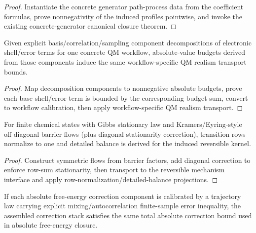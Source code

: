 \begin{proof}
Instantiate the concrete generator path-process data from the coefficient formulas, prove nonnegativity of the induced profiles pointwise, and invoke the existing concrete-generator canonical closure theorem.
\end{proof}

\begin{theorem}\label{thm:concrete-qm-workflow-error-analysis-transport}
Given explicit basis/correlation/sampling component decompositions of electronic shell/error terms for one concrete QM workflow, absolute-value budgets derived from those components induce the same workflow-specific QM realism transport bounds.
\end{theorem}

\begin{proof}
Map decomposition components to nonnegative absolute budgets, prove each base shell/error term is bounded by the corresponding budget sum, convert to workflow calibration, then apply workflow-specific QM realism transport.
\end{proof}

\begin{theorem}\label{thm:barrier-crossing-reversible-chemical-dynamics}
For finite chemical states with Gibbs stationary law and Kramers/Eyring-style off-diagonal barrier flows (plus diagonal stationarity correction), transition rows normalize to one and detailed balance is derived for the induced reversible kernel.
\end{theorem}

\begin{proof}
Construct symmetric flows from barrier factors, add diagonal correction to enforce row-sum stationarity, then transport to the reversible mechanism interface and apply row-normalization/detailed-balance projections.
\end{proof}

\begin{theorem}\label{thm:mixing-autocorrelation-trajectory-correction-total-error}
If each absolute free-energy correction component is calibrated by a trajectory law carrying explicit mixing/autocorrelation finite-sample error inequality, the assembled correction stack satisfies the same total absolute correction bound used in absolute free-energy closure.
\end{theorem}

